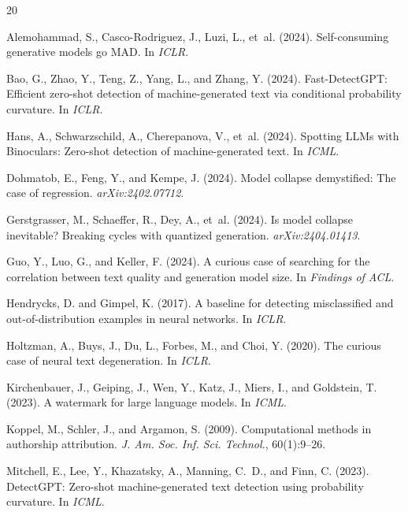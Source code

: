 \documentclass[11pt,a4paper]{article}
\begin{document}
\begin{thebibliography}{20}

Alemohammad, S., Casco-Rodriguez, J., Luzi, L., et~al. (2024).
Self-consuming generative models go MAD.
In \emph{ICLR}.

Bao, G., Zhao, Y., Teng, Z., Yang, L., and Zhang, Y. (2024).
Fast-DetectGPT: Efficient zero-shot detection of machine-generated text via conditional probability curvature.
In \emph{ICLR}.

Hans, A., Schwarzschild, A., Cherepanova, V., et~al. (2024).
Spotting LLMs with Binoculars: Zero-shot detection of machine-generated text.
In \emph{ICML}.

Dohmatob, E., Feng, Y., and Kempe, J. (2024).
Model collapse demystified: The case of regression.
\emph{arXiv:2402.07712}.

Gerstgrasser, M., Schaeffer, R., Dey, A., et~al. (2024).
Is model collapse inevitable? Breaking cycles with quantized generation.
\emph{arXiv:2404.01413}.

Guo, Y., Luo, G., and Keller, F. (2024).
A curious case of searching for the correlation between text quality and generation model size.
In \emph{Findings of ACL}.

Hendrycks, D. and Gimpel, K. (2017).
A baseline for detecting misclassified and out-of-distribution examples in neural networks.
In \emph{ICLR}.

Holtzman, A., Buys, J., Du, L., Forbes, M., and Choi, Y. (2020).
The curious case of neural text degeneration.
In \emph{ICLR}.

Kirchenbauer, J., Geiping, J., Wen, Y., Katz, J., Miers, I., and Goldstein, T. (2023).
A watermark for large language models.
In \emph{ICML}.

Koppel, M., Schler, J., and Argamon, S. (2009).
Computational methods in authorship attribution.
\emph{J. Am. Soc. Inf. Sci. Technol.}, 60(1):9--26.

Mitchell, E., Lee, Y., Khazatsky, A., Manning, C.~D., and Finn, C. (2023).
DetectGPT: Zero-shot machine-generated text detection using probability curvature.
In \emph{ICML}.


\end{thebibliography}
\end{document}
